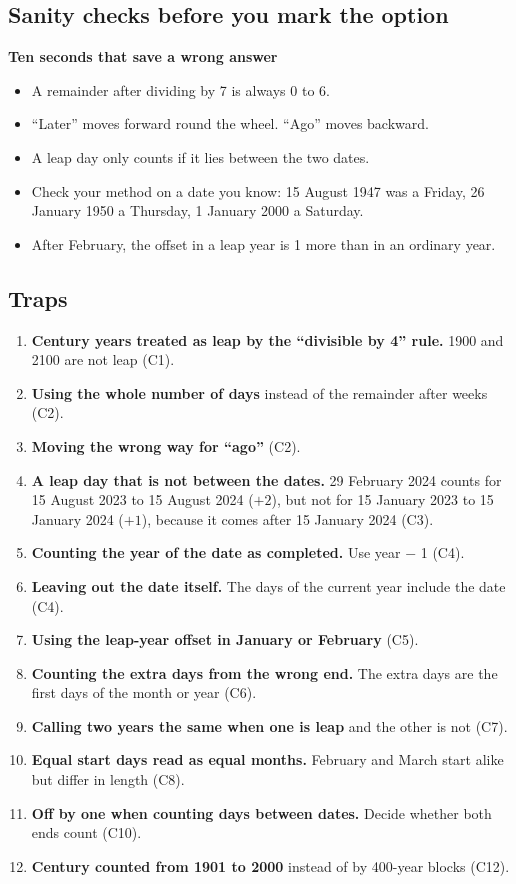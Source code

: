 \documentclass[11pt,a4paper]{article}
\let\oldsubsection\subsection
\renewcommand{\subsection}{\needspace{9\baselineskip}\oldsubsection}
\newcommand{\infobox}[2]{\par\medskip\noindent\begingroup\setlength{\fboxsep}{7pt}%
  \colorbox{codebg}{\parbox{\dimexpr\linewidth-14pt\relax}{\textbf{\color{ember}#1}\par\smallskip #2}}\endgroup\par\medskip}
\begin{document}
\subsection*{Sanity checks before you mark the option}
\infobox{Ten seconds that save a wrong answer}{
\begin{itemize}
\item A remainder after dividing by 7 is always 0 to 6.
\item ``Later'' moves forward round the wheel. ``Ago'' moves backward.
\item A leap day only counts if it lies between the two dates.
\item Check your method on a date you know: 15 August 1947 was a Friday, 26 January 1950 a Thursday, 1 January 2000 a Saturday.
\item After February, the offset in a leap year is 1 more than in an ordinary year.
\end{itemize}}

\subsection*{Traps}
\begin{enumerate}
\item \textbf{Century years treated as leap by the ``divisible by 4'' rule.} 1900 and 2100 are not leap (C1).
\item \textbf{Using the whole number of days} instead of the remainder after weeks (C2).
\item \textbf{Moving the wrong way for ``ago''} (C2).
\item \textbf{A leap day that is not between the dates.} 29 February 2024 counts for 15 August 2023 to 15 August 2024 ($+2$), but not for 15 January 2023 to 15 January 2024 ($+1$), because it comes after 15 January 2024 (C3).
\item \textbf{Counting the year of the date as completed.} Use year $-$ 1 (C4).
\item \textbf{Leaving out the date itself.} The days of the current year include the date (C4).
\item \textbf{Using the leap-year offset in January or February} (C5).
\item \textbf{Counting the extra days from the wrong end.} The extra days are the first days of the month or year (C6).
\item \textbf{Calling two years the same when one is leap} and the other is not (C7).
\item \textbf{Equal start days read as equal months.} February and March start alike but differ in length (C8).
\item \textbf{Off by one when counting days between dates.} Decide whether both ends count (C10).
\item \textbf{Century counted from 1901 to 2000} instead of by 400-year blocks (C12).
\end{enumerate}
\end{document}

